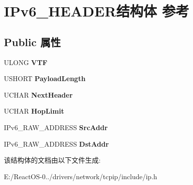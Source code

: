 \hypertarget{struct_i_pv6___h_e_a_d_e_r}{}\section{I\+Pv6\+\_\+\+H\+E\+A\+D\+E\+R结构体 参考}
\label{struct_i_pv6___h_e_a_d_e_r}
\subsection*{Public 属性}
\begin{DoxyCompactItemize}
\item 
\mbox{\label{struct_i_pv6___h_e_a_d_e_r_ae5861d676297150bc7f8b7c147a4c0cc}} 
U\+L\+O\+NG {\bfseries V\+TF}
\item 
\mbox{\label{struct_i_pv6___h_e_a_d_e_r_a4aaf891819a1c7e030aca344ff30593d}} 
U\+S\+H\+O\+RT {\bfseries Payload\+Length}
\item 
\mbox{\label{struct_i_pv6___h_e_a_d_e_r_a20ff59edb56632b5102efd5682e07d5d}} 
U\+C\+H\+AR {\bfseries Next\+Header}
\item 
\mbox{\label{struct_i_pv6___h_e_a_d_e_r_a89b03f3d58d59d54435fc3f33631a039}} 
U\+C\+H\+AR {\bfseries Hop\+Limit}
\item 
\mbox{\label{struct_i_pv6___h_e_a_d_e_r_ae2b18713ac6630319d83f7fb03f55f09}} 
I\+Pv6\+\_\+\+R\+A\+W\+\_\+\+A\+D\+D\+R\+E\+SS {\bfseries Src\+Addr}
\item 
\mbox{\label{struct_i_pv6___h_e_a_d_e_r_a4a15e45e4b4fd34b22ed7ef4dc058661}} 
I\+Pv6\+\_\+\+R\+A\+W\+\_\+\+A\+D\+D\+R\+E\+SS {\bfseries Dst\+Addr}
\end{DoxyCompactItemize}


该结构体的文档由以下文件生成\+:\begin{DoxyCompactItemize}
\item 
E\+:/\+React\+O\+S-\/0../drivers/network/tcpip/include/ip.\+h\end{DoxyCompactItemize}
